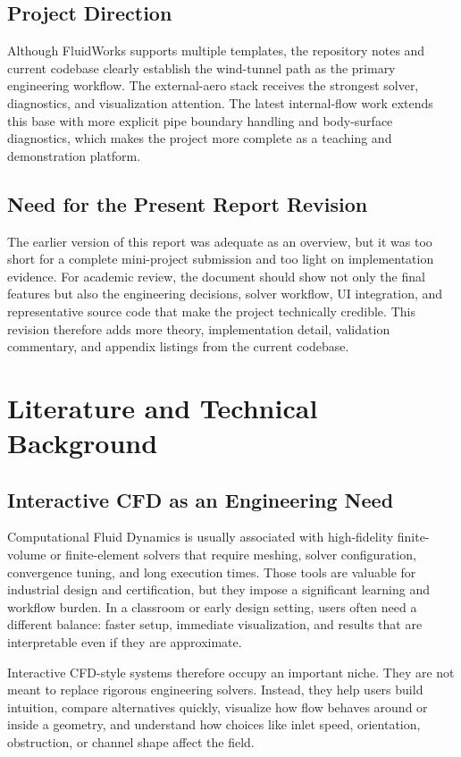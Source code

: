 \documentclass[12pt,a4paper,titlepage]{report}
\begin{document}
\section{Project Direction}
Although FluidWorks supports multiple templates, the repository notes and current codebase clearly establish the wind-tunnel path as the primary engineering workflow. The external-aero stack receives the strongest solver, diagnostics, and visualization attention. The latest internal-flow work extends this base with more explicit pipe boundary handling and body-surface diagnostics, which makes the project more complete as a teaching and demonstration platform.

\section{Need for the Present Report Revision}
The earlier version of this report was adequate as an overview, but it was too short for a complete mini-project submission and too light on implementation evidence. For academic review, the document should show not only the final features but also the engineering decisions, solver workflow, UI integration, and representative source code that make the project technically credible. This revision therefore adds more theory, implementation detail, validation commentary, and appendix listings from the current codebase.

\chapter{Literature and Technical Background}
\section{Interactive CFD as an Engineering Need}
Computational Fluid Dynamics is usually associated with high-fidelity finite-volume or finite-element solvers that require meshing, solver configuration, convergence tuning, and long execution times. Those tools are valuable for industrial design and certification, but they impose a significant learning and workflow burden. In a classroom or early design setting, users often need a different balance: faster setup, immediate visualization, and results that are interpretable even if they are approximate.

Interactive CFD-style systems therefore occupy an important niche. They are not meant to replace rigorous engineering solvers. Instead, they help users build intuition, compare alternatives quickly, visualize how flow behaves around or inside a geometry, and understand how choices like inlet speed, orientation, obstruction, or channel shape affect the field.
\end{document}
